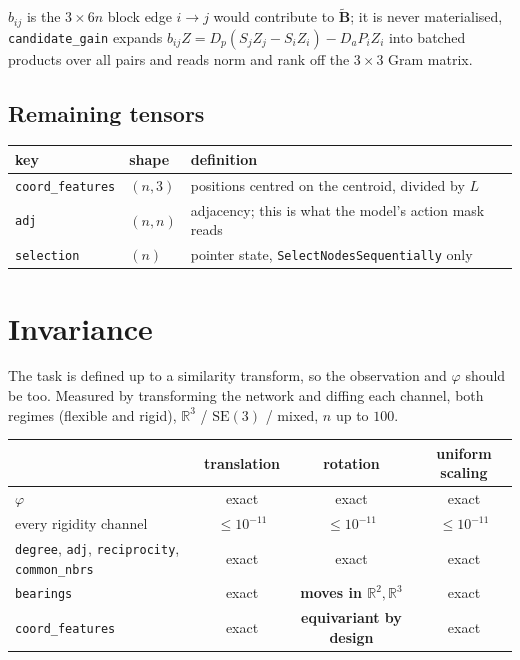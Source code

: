 \documentclass[11pt,a4paper]{article}
\newcommand{\R}{\mathbb{R}}
\newcommand{\SEthree}{\mathrm{SE}(3)}
\newcommand{\Bs}{\widetilde{\mathbf{B}}}
\begin{document}
\noindent
$b_{ij}$ is the $3\times 6n$ block edge $i\to j$ would contribute to $\Bs$; it is never
materialised, \texttt{candidate\_gain} expands
$b_{ij}Z=D_p(S_jZ_j-S_iZ_i)-D_aP_iZ_i$ into batched products over all pairs and reads norm
and rank off the $3\times3$ Gram matrix.

\subsection*{Remaining tensors}
\begin{center}
\begin{tabular}{lll}
\toprule
key & shape & definition \\
\midrule
\texttt{coord\_features} & $(n,3)$ & positions centred on the centroid, divided by $L$ \\
\texttt{adj} & $(n,n)$ & adjacency; this is what the model's action mask reads \\
\texttt{selection} & $(n)$ & pointer state, \texttt{SelectNodesSequentially} only \\
\bottomrule
\end{tabular}
\end{center}

\section{Invariance}

The task is defined up to a similarity transform, so the observation and $\varphi$ should be
too. Measured by transforming the network and diffing each channel, both regimes
(flexible and rigid), $\R^3$ / $\SEthree$ / mixed, $n$ up to $100$.

\begin{center}
\begin{tabular}{lccc}
\toprule
 & translation & rotation & uniform scaling \\
\midrule
$\varphi$ & exact & exact & exact \\
every rigidity channel & $\le 10^{-11}$ & $\le 10^{-11}$ & $\le 10^{-11}$ \\
\texttt{degree}, \texttt{adj}, \texttt{reciprocity}, \texttt{common\_nbrs} & exact & exact & exact \\
\texttt{bearings} & exact & \textbf{moves in $\R^2,\R^3$} & exact \\
\texttt{coord\_features} & exact & \textbf{equivariant by design} & exact \\
\bottomrule
\end{tabular}
\end{center}
\end{document}
